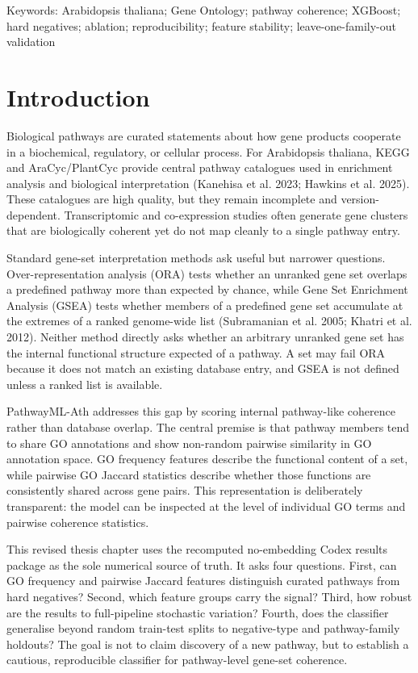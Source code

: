 \documentclass[11pt]{article}
\begin{document}
Keywords: Arabidopsis thaliana; Gene Ontology; pathway coherence; XGBoost; hard negatives; ablation; reproducibility; feature stability; leave-one-family-out validation

\tableofcontents
\clearpage
\section{Introduction}
Biological pathways are curated statements about how gene products cooperate in a biochemical, regulatory, or cellular process. For Arabidopsis thaliana, KEGG and AraCyc/PlantCyc provide central pathway catalogues used in enrichment analysis and biological interpretation (Kanehisa et al. 2023; Hawkins et al. 2025). These catalogues are high quality, but they remain incomplete and version-dependent. Transcriptomic and co-expression studies often generate gene clusters that are biologically coherent yet do not map cleanly to a single pathway entry.

Standard gene-set interpretation methods ask useful but narrower questions. Over-representation analysis (ORA) tests whether an unranked gene set overlaps a predefined pathway more than expected by chance, while Gene Set Enrichment Analysis (GSEA) tests whether members of a predefined gene set accumulate at the extremes of a ranked genome-wide list (Subramanian et al. 2005; Khatri et al. 2012). Neither method directly asks whether an arbitrary unranked gene set has the internal functional structure expected of a pathway. A set may fail ORA because it does not match an existing database entry, and GSEA is not defined unless a ranked list is available.

PathwayML-Ath addresses this gap by scoring internal pathway-like coherence rather than database overlap. The central premise is that pathway members tend to share GO annotations and show non-random pairwise similarity in GO annotation space. GO frequency features describe the functional content of a set, while pairwise GO Jaccard statistics describe whether those functions are consistently shared across gene pairs. This representation is deliberately transparent: the model can be inspected at the level of individual GO terms and pairwise coherence statistics.

This revised thesis chapter uses the recomputed no-embedding Codex results package as the sole numerical source of truth. It asks four questions. First, can GO frequency and pairwise Jaccard features distinguish curated pathways from hard negatives? Second, which feature groups carry the signal? Third, how robust are the results to full-pipeline stochastic variation? Fourth, does the classifier generalise beyond random train-test splits to negative-type and pathway-family holdouts? The goal is not to claim discovery of a new pathway, but to establish a cautious, reproducible classifier for pathway-level gene-set coherence.
\end{document}
